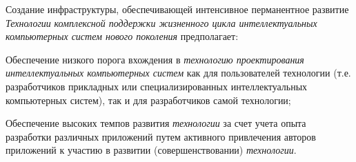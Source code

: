 Создание инфраструктуры, обеспечивающей интенсивное перманентное развитие \textit{Технологии} \textit{комплексной поддержки жизненного цикла интеллектуальных компьютерных систем нового поколения} предполагает:

\begin{textitemize}
	\item
	Обеспечение низкого порога вхождения в \textit{технологию проектирования интеллектуальных компьютерных систем} как для пользователей технологии (т.е. разработчиков прикладных или специализированных интеллектуальных компьютерных систем), так и для разработчиков самой технологии;
	\item
	Обеспечение высоких темпов развития \textit{технологии} за счет учета опыта разработки различных приложений путем активного привлечения авторов приложений к участию в развитии (совершенствовании) \textit{технологии}.
\end{textitemize}

